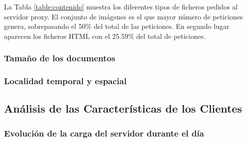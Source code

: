 \documentclass[twocolumn,twoside]{Jornadas}
\begin{document}
La Tabla \ref{table:contenido} muestra los diferentes tipos de ficheros pedidos al servidor proxy. El conjunto de imágenes es el que mayor número de peticiones genera, sobrepasando el 50\% del total de las peticiones. En segundo lugar aparecen los ficheros HTML con el 25.59\% del total de peticiones. 

\subsubsection{Tamaño de los documentos}
\label{documentos}

\subsubsection{Localidad temporal y espacial}
\label{loacalidad}

\subsection{Análisis de las Características de los Clientes}
\label{clientes}

\subsubsection{Evolución de la carga del servidor durante el día}
\end{document}
